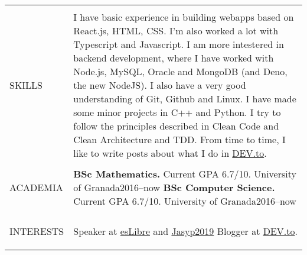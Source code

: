 \documentclass[letterpaper,10pt,oneside]{article}
\newcommand{\DatestampY}[1]{#1}
\newenvironment{body}
{\par\par
\begin{longtable}{p{0.125\textwidth}p{0.84\textwidth}}}
{\par\end{longtable}\par}
\renewcommand{\section}[3]{\\[-0.7cm]\pdfbookmark[2]{#2}{#3}\\%
\raggedleft  %
{\fontsize{9.5pt}{9.5pt}\selectfont\bfseries\raggedright%
\MakeUppercase{#1}}&}
\begin{document}
\begin{body}

\section{Skills}{Skills}{PDF:Skills}

I have basic experience in building webapps based on React.js, HTML, CSS. I'm also worked a lot with Typescript and Javascript. I am more intestered in backend development, where I have worked with Node.js, MySQL, Oracle and MongoDB (and Deno, the new NodeJS). I also have a very good understanding of Git, Github and Linux. I have made some minor projects in C++ and Python. I try to follow the principles described in Clean Code and Clean Architecture and TDD. From time to time, I like to write posts about what I do in \href{https://dev.to/antoniogamiz}{DEV.to}.


\section{Academia}{Academia}{PDF:Academia}

\textbf{BSc Mathematics.} Current GPA 6.7/10. University of Granada\hfill \DatestampY{2016}--\DatestampY{now}\newline
\textbf{BSc Computer Science.} Current GPA 6.7/10. University of Granada\hfill \DatestampY{2016}--\DatestampY{now}


\section{Interests}{Interests}{PDF:Interests}
Speaker at \href{https://github.com/antoniogamiz/discovering-perl6-talk}{esLibre} and \href{https://interferencias.tech/2019/04/20/jasyp-2019/}{Jasyp2019} \newline
Blogger at \href{https://dev.to/antoniogamiz}{DEV.to}.

\end{body}
\end{document}
